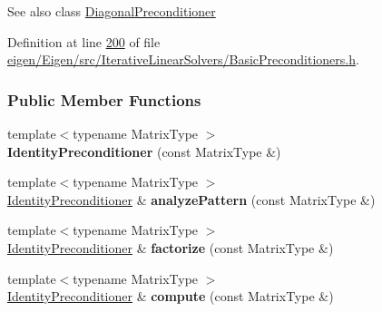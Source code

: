 \begin{DoxySeeAlso}{See also}
class \hyperlink{group___iterative_linear_solvers___module_class_eigen_1_1_diagonal_preconditioner}{Diagonal\+Preconditioner} 
\end{DoxySeeAlso}


Definition at line \hyperlink{eigen_2_eigen_2src_2_iterative_linear_solvers_2_basic_preconditioners_8h_source_l00200}{200} of file \hyperlink{eigen_2_eigen_2src_2_iterative_linear_solvers_2_basic_preconditioners_8h_source}{eigen/\+Eigen/src/\+Iterative\+Linear\+Solvers/\+Basic\+Preconditioners.\+h}.

\subsubsection*{Public Member Functions}
\begin{DoxyCompactItemize}
\item 
\mbox{\label{group___iterative_linear_solvers___module_a5fb381c622f38f3b8deb0775867cdf5f}} 
{\footnotesize template$<$typename Matrix\+Type $>$ }\\{\bfseries Identity\+Preconditioner} (const Matrix\+Type \&)
\item 
\mbox{\label{group___iterative_linear_solvers___module_a87036e0a457777e2c3df4c103b4f8233}} 
{\footnotesize template$<$typename Matrix\+Type $>$ }\\\hyperlink{group___iterative_linear_solvers___module_class_eigen_1_1_identity_preconditioner}{Identity\+Preconditioner} \& {\bfseries analyze\+Pattern} (const Matrix\+Type \&)
\item 
\mbox{\label{group___iterative_linear_solvers___module_a0d0c662f8811acabd6b69cfda901965f}} 
{\footnotesize template$<$typename Matrix\+Type $>$ }\\\hyperlink{group___iterative_linear_solvers___module_class_eigen_1_1_identity_preconditioner}{Identity\+Preconditioner} \& {\bfseries factorize} (const Matrix\+Type \&)
\item 
\mbox{\label{group___iterative_linear_solvers___module_af3c2afdd74084ffa2ae9174df0316695}} 
{\footnotesize template$<$typename Matrix\+Type $>$ }\\\hyperlink{group___iterative_linear_solvers___module_class_eigen_1_1_identity_preconditioner}{Identity\+Preconditioner} \& {\bfseries compute} (const Matrix\+Type \&)

\end{DoxyCompactItemize}
